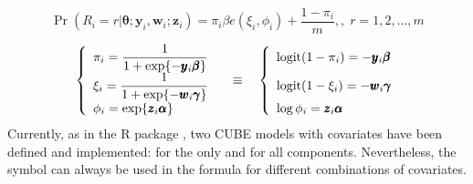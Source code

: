 \documentclass[letterpaper,10pt,english]{sphinxmanual}
\begin{document}
\sphinxAtStartPar
{}
\begin{equation*}
\begin{split}\Pr(R_i=r|\pmb{\theta};\pmb y_i, \pmb w_i; \pmb z_i) = \pi_i \beta e(\xi_i,\phi_i)+\dfrac{1-\pi_i}{m},
,\; r=1,2,\ldots,m\end{split}
\end{equation*}\begin{equation*}
\begin{split}\left\{
\begin{array}{l}
    \pi_i = \dfrac{1}{1+\exp\{ -\pmb y_i \pmb\beta\}}
    \\
    \xi_i = \dfrac{1}{1+\exp\{ -\pmb w_i \pmb\gamma\}}
    \\
    \phi_i = \exp\{ \pmb z_i \pmb \alpha \}
\end{array}
\right.
\quad \equiv \quad
\left\{
\begin{array}{l}
    \mathrm{logit}(1-\pi_i) = -\pmb y_i \pmb\beta
    \vphantom{\dfrac{1}{1+\exp\{ -\pmb y_i \pmb\beta\}}}
    \\
    \mathrm{logit}(1-\xi_i) = -\pmb w_i \pmb\gamma
    \vphantom{\dfrac{1}{1+\exp\{ -\pmb w_i \pmb\gamma\}}}
    \\
    \log \phi_i = \pmb z_i \pmb \alpha
    \vphantom{\exp\{ \pmb z_i \pmb \alpha \}}
\end{array}
\right.\end{split}
\end{equation*}
\sphinxAtStartPar
Currently, as in the R package , two CUBE models with covariates have been defined and implemented:
for the  only and for all components.
Nevertheless, the symbol  can always be used in the
formula for different combinations of covariates.
\end{document}

